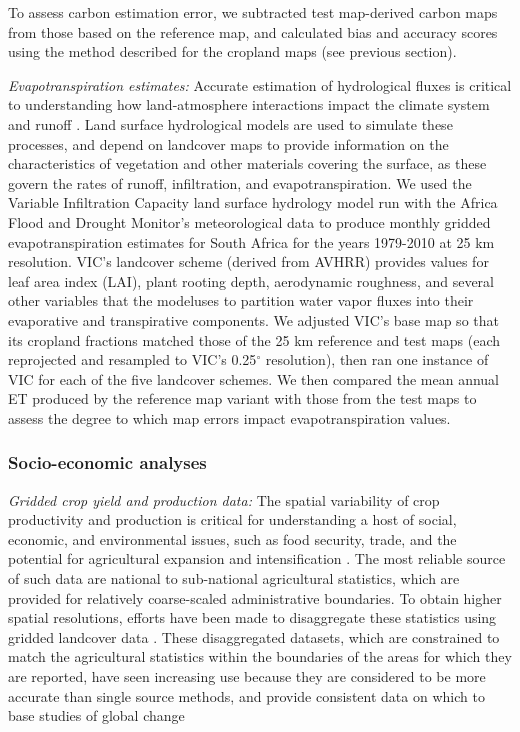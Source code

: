 \documentclass[a4paper]{article}
\begin{document}
To assess carbon estimation error, we subtracted test map-derived carbon maps from those based on the reference map, and calculated bias and accuracy scores using the method described for the cropland maps (see previous section). 

\vspace{4 pt}
\noindent\emph{Evapotranspiration estimates: }
Accurate estimation of hydrological fluxes is critical to understanding how land-atmosphere interactions impact the climate system and runoff \citep{liang_simple_1994}. Land surface hydrological models are used to simulate these processes, and depend on landcover maps to provide information on the characteristics of vegetation and other materials covering the surface, as these govern the rates of runoff, infiltration, and evapotranspiration. We used the Variable Infiltration Capacity \citep[VIC;][]{liang_simple_1994} land surface hydrology model run with the Africa Flood and Drought Monitor's meteorological data \citep{sheffield_drought_2013} to produce monthly gridded evapotranspiration estimates for South Africa for the years 1979-2010 at 25 km resolution. VIC's landcover scheme (derived from AVHRR) provides values for leaf area index (LAI), plant rooting depth, aerodynamic roughness, and several other variables that the modeluses to partition water vapor fluxes into their evaporative and transpirative components. We adjusted VIC's base map so that its cropland fractions matched those of the 25 km reference and test maps (each reprojected and resampled to VIC's 0.25$^{\circ}$ resolution), then ran one instance of VIC for each of the five landcover schemes. We then compared the mean annual ET produced by the reference map variant with those from the test maps to assess the degree to which map errors impact evapotranspiration values. 

\subsubsection*{Socio-economic analyses}
\noindent\emph{Gridded crop yield and production data: }
The spatial variability of crop productivity and production is critical for understanding a host of social, economic, and environmental issues, such as food security, trade, and the potential for agricultural expansion and intensification \citep{licker_mind_2010,monfreda_farming_2008}. The most reliable source of such data are national to sub-national agricultural statistics, which are provided for relatively coarse-scaled administrative boundaries. To obtain higher spatial resolutions, efforts have been made to disaggregate these statistics using gridded landcover data \citep{ramankutty_farming_2008,monfreda_farming_2008}. These disaggregated datasets, which are constrained to match the agricultural statistics within the boundaries of the areas for which they are reported, have seen increasing use because they are considered to be more accurate than single source methods, and provide consistent data on which to base studies of global change \citep{ramankutty_farming_2008, see_improved_2015}
\end{document}
